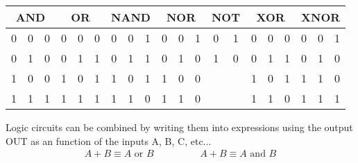 \begin{center}
	\begin{tabular}{|| c c|c||c c|c||c c|c||c c|c||c|c||c c|c||cc|c||}
		\hline
		\multicolumn{3}{||c||}{AND}&
		\multicolumn{3}{|c||}{OR}&
		\multicolumn{3}{|c||}{NAND}&
		\multicolumn{3}{|c||}{NOR}&
		\multicolumn{2}{|c||}{NOT}&
		\multicolumn{3}{|c||}{XOR}&
		\multicolumn{3}{|c||}{XNOR}\\
		\hline
		0 & 0 & 0 & 
		0 & 0 & 0 & 
		0 & 0 & 1 & 
		0 & 0 & 1 & 
		0 & 1 & 
		0 & 0 & 0 & 
		0 & 0 & 1 \\
		0 & 1 & 0 & 
		0 & 1 & 1 & 
		0 & 1 & 1 & 
		0 & 1 & 0 & 
		1 & 0 & 
		0 & 1 & 1 & 
		0 & 1 & 0 \\
		1 & 0 & 0 & 
		1 & 0 & 1 & 
		1 & 0 & 1 & 
		1 & 0 & 0 & 
		& & 
		1 & 0 & 1 & 
		1 & 1 & 0 \\
		1 & 1 & 1 & 
		1 & 1 & 1 & 
		1 & 1 & 0 & 
		1 & 1 & 0 & 
		&  & 
		1 & 1 & 0 & 
		1 & 1 & 1 \\
		\hline
	\end{tabular}
\end{center}

Logic circuits can be combined by writing them into expressions using the output OUT as an function of the inputs A, B, C, etc...
\begin{align}
A + B \equiv A \textrm{ or } B \hspace{2cm} A + B \equiv A \textrm{ and } B
\end{align}
